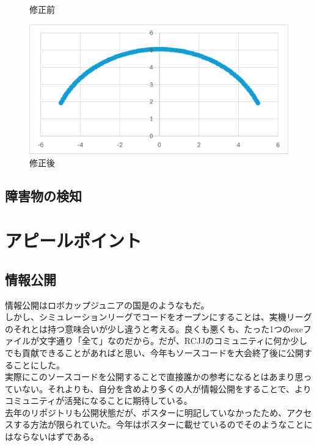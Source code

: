 \documentclass[uplatex,dvipdfmx,a4paper]{jsarticle}
\begin{document}
\begin{figure}[H]
\begin{minipage}[b]{0.45\linewidth}
        \caption{修正前}
      \end{minipage}
      \begin{minipage}[b]{0.45\linewidth}
        \centering
        \includegraphics[keepaspectratio, scale=0.5]{Photo/画像2.png}
        \caption{修正後}
      \end{minipage}
    \end{figure}

    \subsection{障害物の検知}

  \section{アピールポイント}
    \subsection{情報公開}
    情報公開はロボカップジュニアの国是のようなもだ。\\
    しかし、シミュレーションリーグでコードをオープンにすることは、実機リーグのそれとは持つ意味合いが少し違うと考える。良くも悪くも、たった1つのexeファイルが文字通り「全て」なのだから。だが、RCJJのコミュニティに何か少しでも貢献できることがあればと思い、今年もソースコードを大会終了後に公開することにした。\\
    実際にこのソースコードを公開することで直接誰かの参考になるとはあまり思っていない。それよりも、自分を含めより多くの人が情報公開をすることで、よりコミュニティが活発になることに期待している。\\

    去年のリポジトリも公開状態だが、ポスターに明記していなかったため、アクセスする方法が限られていた。今年はポスターに載せているのでそのようなことにはならないはずである。\\
    
\end{document}
